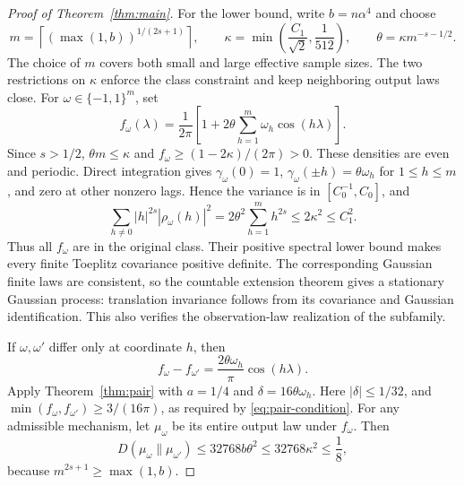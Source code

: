 \documentclass[11pt]{article}
\theoremstyle{remark}
\newcommand{\KL}{D}
\begin{document}
\begin{proof}[Proof of Theorem~\ref{thm:main}]
For the lower bound, write $b=n\alpha^4$ and choose
\begin{equation}\label{eq:packing}
 m=\left\lceil(\max(1,b))^{1/(2s+1)}\right\rceil,
 \qquad \kappa=\min\left(\frac{C_1}{\sqrt2},\frac1{512}\right),
 \qquad \theta=\kappa m^{-s-1/2}.
\end{equation}
The choice of $m$ covers both small and large effective sample sizes.
The two restrictions on $\kappa$ enforce the class constraint and keep
neighboring output laws close. For $\omega\in\{-1,1\}^m$, set
\begin{equation}\label{eq:hypercube}
 f_\omega(\lambda)=\frac1{2\pi}
             \left[1+2\theta\sum_{h=1}^m\omega_h\cos(h\lambda)\right].
\end{equation}
Since $s>1/2$, $\theta m\le\kappa$ and
$f_\omega\ge(1-2\kappa)/(2\pi)>0$. These densities are even and periodic.
Direct integration gives $\gamma_\omega(0)=1$,
$\gamma_\omega(\pm h)=\theta\omega_h$ for $1\le h\le m$, and zero at
other nonzero lags. Hence the variance is in $[C_0^{-1},C_0]$, and
\[
 \sum_{h\ne0}|h|^{2s}|\rho_\omega(h)|^2
 =2\theta^2\sum_{h=1}^m h^{2s}\le2\kappa^2\le C_1^2.
\]
Thus all $f_\omega$ are in the original class. Their positive spectral
lower bound makes every finite Toeplitz covariance positive definite.
The corresponding Gaussian finite laws are consistent, so the countable
extension theorem \cite[Theorem A.3.1]{Durrett} gives a stationary Gaussian
process: translation invariance follows from its covariance and Gaussian
identification. This also verifies the observation-law realization of the
subfamily.

If $\omega,\omega'$ differ only at coordinate $h$, then
\[
 f_\omega-f_{\omega'}=\frac{2\theta\omega_h}{\pi}\cos(h\lambda).
\]
Apply Theorem~\ref{thm:pair} with $a=1/4$ and $\delta=16\theta\omega_h$.
Here $|\delta|\le1/32$, and
$\min(f_\omega,f_{\omega'})\ge3/(16\pi)$, as required by
\eqref{eq:pair-condition}. For any admissible mechanism, let $\mu_\omega$
be its entire output law under $f_\omega$. Then
\begin{equation}\label{eq:neighbor}
 \KL(\mu_\omega\|\mu_{\omega'})
 \le32768 b\theta^2
 \le32768\kappa^2\le\frac18,
\end{equation}
because $m^{2s+1}\ge\max(1,b)$.


\end{proof}
\end{document}
